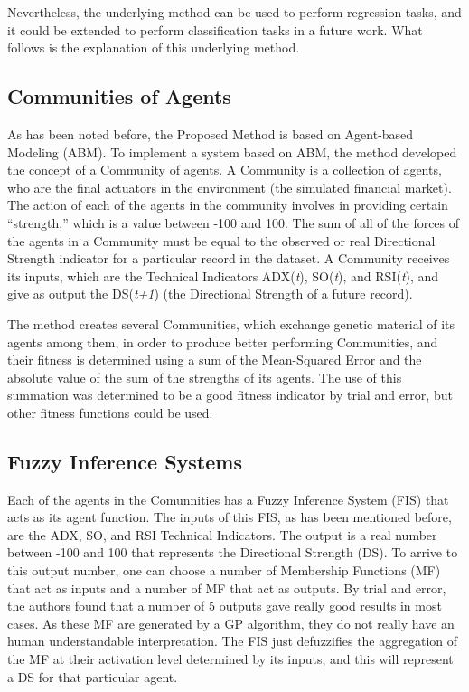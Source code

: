 \documentclass[12pt,journal,draftcls,onecolumn]{IEEEtran}
\begin{document}
Nevertheless, the underlying method can be used to perform regression tasks, and it could be extended to perform classification tasks in a future work. What follows is the explanation of this underlying method.

\subsection{Communities of Agents}
\label{communities-of-agents}

As has been noted before, the Proposed Method is based on Agent-based Modeling (ABM). To implement a system based on ABM, the method developed the concept of a Community of agents. A Community is a collection of agents, who are the final actuators in the environment (the simulated financial market). The action of each of the agents in the community involves in providing certain ``strength,'' which is a value between -100 and 100. The sum of all of the forces of the agents in a Community must be equal to the observed or real Directional Strength indicator for a particular record in the dataset. A Community receives its inputs, which are the Technical Indicators ADX(\textit{t}), SO(\textit{t}), and RSI(\textit{t}), and give as output the DS(\textit{t+1}) (the Directional Strength of a future record).

The method creates several Communities, which exchange genetic material of its agents among them, in order to produce better performing Communities, and their fitness is determined using a sum of the Mean-Squared Error and the absolute value of the sum of the strengths of its agents. The use of this summation was determined to be a good fitness indicator by trial and error, but other fitness functions could be used.

\subsection{Fuzzy Inference Systems}

Each of the agents in the Comunnities has a Fuzzy Inference System (FIS) that acts as its agent function. The inputs of this FIS, as has been mentioned before, are the ADX, SO, and RSI Technical Indicators. The output is a real number between -100 and 100 that represents the Directional Strength (DS). To arrive to this output number, one can choose a number of Membership Functions (MF) that act as inputs and a number of MF that act as outputs. By trial and error, the authors found that a number of 5 outputs gave really good results in most cases. As these MF are generated by a GP algorithm, they do not really have an human understandable interpretation. The FIS just defuzzifies the aggregation of the MF at their activation level determined by its inputs, and this will represent a DS for that particular agent.
\end{document}
